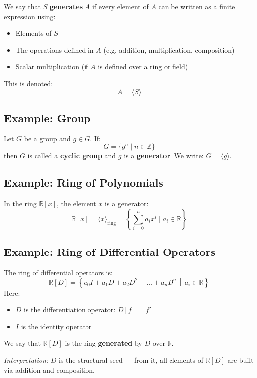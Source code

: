 \documentclass[12pt]{article}
\begin{document}
	We say that $S$ \textbf{generates} $A$ if every element of $A$ can be written as a finite expression using:
	\begin{itemize}
		\item Elements of $S$
		\item The operations defined in $A$ (e.g. addition, multiplication, composition)
		\item Scalar multiplication (if $A$ is defined over a ring or field)
	\end{itemize}
	
	This is denoted:
	\[
	A = \langle S \rangle
	\]
	
	\subsection*{Example: Group}
	
	Let $G$ be a group and $g \in G$. If:
	\[
	G = \{g^n \mid n \in \mathbb{Z}\}
	\]
	then $G$ is called a \textbf{cyclic group} and $g$ is a \textbf{generator}. We write: $G = \langle g \rangle$.
	
	\subsection*{Example: Ring of Polynomials}
	
	In the ring $\mathbb{R}[x]$, the element $x$ is a generator:
	\[
	\mathbb{R}[x] = \langle x \rangle_{\text{ring}} = \left\{ \sum_{i=0}^n a_i x^i \mid a_i \in \mathbb{R} \right\}
	\]
	
	\subsection*{Example: Ring of Differential Operators}
	
	The ring of differential operators is:
	\[
	\mathbb{R}[D] = \left\{ a_0 I + a_1 D + a_2 D^2 + \dots + a_n D^n \,\middle|\, a_i \in \mathbb{R} \right\}
	\]
	Here:
	\begin{itemize}
		\item $D$ is the differentiation operator: $D[f] = f'$
		\item $I$ is the identity operator
	\end{itemize}
	
	We say that $\mathbb{R}[D]$ is the ring \textbf{generated} by $D$ over $\mathbb{R}$.
	
	\vspace{1em}
	\noindent
	\emph{Interpretation:} $D$ is the structural seed — from it, all elements of $\mathbb{R}[D]$ are built via addition and composition.
		
\end{document}
